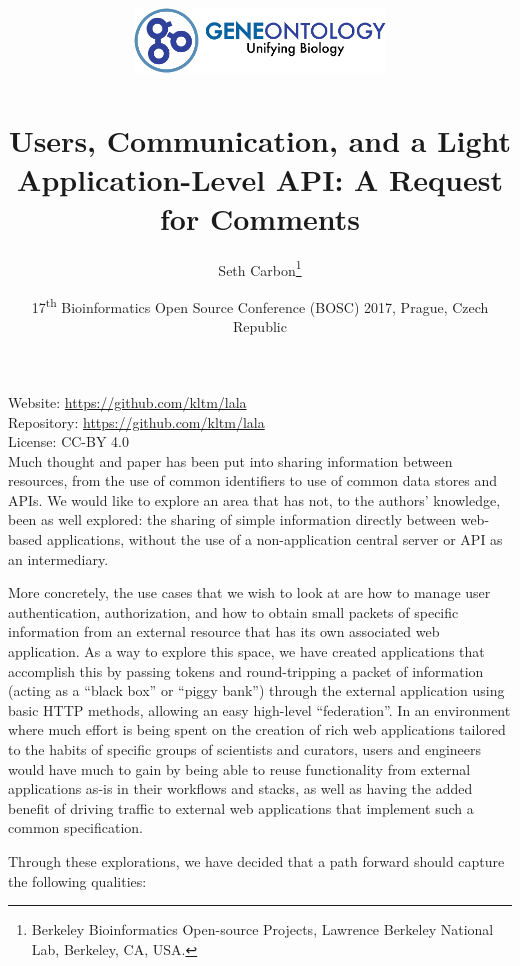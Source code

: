 \documentclass[10pt,oneside]{article}
\title{%
\vspace{-1.5in}
\includegraphics[width=0.5\textwidth,natwidth=485,natheight=125]{go-logo-small.png}\\
~\\Users, Communication, and a Light Application-Level API: A Request for Comments}
\author{
  Seth Carbon\footnote{Berkeley Bioinformatics Open-source Projects, Lawrence Berkeley National Lab, Berkeley, CA, USA.} %
}
\date{17\textsuperscript{th} Bioinformatics Open Source Conference
  (BOSC) 2017, Prague, Czech Republic}
\begin{document}
\maketitle
\thispagestyle{empty}

\vspace{-0.2in}
\noindent
Website: \url{https://github.com/kltm/lala} \\
Repository: \url{https://github.com/kltm/lala} \\
License: CC-BY 4.0 \\


Much thought and paper has been put into sharing information between
resources, from the use of common identifiers to use of common data
stores and APIs. We would like to explore an area that has not, to the
authors' knowledge, been as well explored: the sharing of simple
information directly between web-based applications, without the use
of a non-application central server or API as an intermediary.

More concretely, the use cases that we wish to look at are how to
manage user authentication, authorization, and how to obtain small
packets of specific information from an external resource that has its
own associated web application. As a way to explore this space, we
have created applications that accomplish this by passing tokens and
round-tripping a packet of information (acting as a ``black box'' or
``piggy bank'') through the external application using basic HTTP
methods, allowing an easy high-level ``federation''. In an environment
where much effort is being spent on the creation of rich web
applications tailored to the habits of specific groups of scientists
and curators, users and engineers would have much to gain by being
able to reuse functionality from external applications as-is in their
workflows and stacks, as well as having the added benefit of driving
traffic to external web applications that implement such a common
specification.

Through these explorations, we have decided that a path forward should
capture the following qualities:
\end{document}

